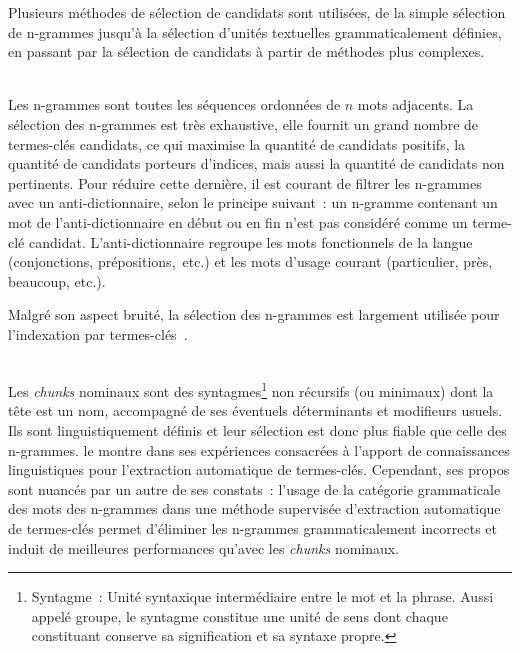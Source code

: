     Plusieurs méthodes de sélection de candidats sont utilisées, de la simple
    sélection de n-grammes jusqu'à la sélection d'unités textuelles
    grammaticalement définies, en passant par la sélection de candidats à partir
    de méthodes plus complexes.

    ~\\Les n-grammes sont
    toutes les séquences ordonnées de $n$ mots adjacents. La sélection des
    n-grammes est très exhaustive, elle fournit un grand nombre de termes-clés
    candidats, ce qui maximise la quantité de candidats positifs, la quantité de
    candidats porteurs d'indices, mais aussi la quantité de candidats non
    pertinents. Pour réduire cette dernière, il est courant de filtrer les
    n-grammes avec un
    anti-dictionnaire, selon le principe suivant~: un n-gramme
    contenant un mot de l'anti-dictionnaire en début ou en fin n'est pas
    considéré comme un terme-clé candidat. L'anti-dictionnaire regroupe les mots
    fonctionnels de la langue (conjonctions, prépositions,~etc.) et les mots
    d'usage courant (\og{}particulier\fg{}, \og{}près\fg{}, \og{}beaucoup\fg{},
    etc.).
    
    Malgré son aspect bruité, la sélection des n-grammes est largement utilisée
    pour l'indexation par
    termes-clés~\cite{witten1999kea,hulth2003keywordextraction,medelyan2009humancompetitivetagging}.

    \begin{example}
    \end{example}

    ~\\Les \textit{chunks} nominaux
    sont des syntagmes\footnote{Syntagme~: Unité syntaxique
    intermédiaire entre le mot et la phrase. Aussi appelé groupe, le syntagme
    constitue une unité de sens dont chaque constituant conserve sa
    signification et sa syntaxe propre.} non récursifs (ou minimaux) dont la
    tête est un nom, accompagné de ses éventuels déterminants et modifieurs
    usuels. Ils sont linguistiquement définis et leur sélection est donc plus
    fiable que celle des n-grammes.  le
    montre dans ses expériences consacrées à l'apport de connaissances
    linguistiques pour l'extraction automatique de termes-clés. Cependant, ses
    propos sont nuancés par un autre de ses constats~: l'usage de la catégorie
    grammaticale des mots des n-grammes dans une méthode supervisée d'extraction
    automatique de termes-clés permet d'éliminer les n-grammes grammaticalement
    incorrects et induit de meilleures performances qu'avec les \textit{chunks}
    nominaux.

